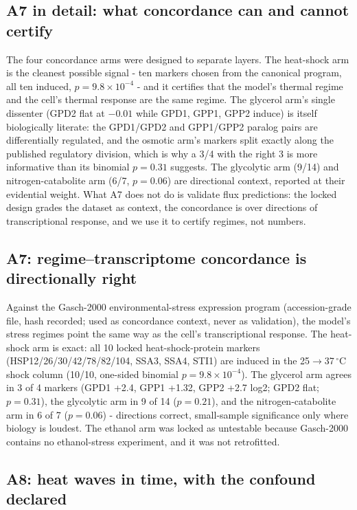 \documentclass[12pt]{article}
\begin{document}
\subsection{A7 in detail: what concordance can and cannot certify}

The four concordance arms were designed to separate layers. The
heat-shock arm is the cleanest possible signal - ten markers chosen
from the canonical program, all ten induced, $p=9.8\times10^{-4}$ -
and it certifies that the model's thermal regime and the cell's
thermal response are the same regime. The glycerol arm's single
dissenter (GPD2 flat at $-0.01$ while GPD1, GPP1, GPP2 induce) is
itself biologically literate: the GPD1/GPD2 and GPP1/GPP2 paralog
pairs are differentially regulated, and the osmotic arm's markers
split exactly along the published regulatory division, which is why a
3/4 with the right 3 is more informative than its binomial $p=0.31$
suggests. The glycolytic arm (9/14) and nitrogen-catabolite arm
(6/7, $p=0.06$) are directional context, reported at their evidential
weight. What A7 does not do is validate flux predictions: the locked
design grades the dataset as context, the concordance is over
directions of transcriptional response, and we use it to certify
regimes, not numbers.

\subsection{A7: regime--transcriptome concordance is directionally right}
\label{sec:a7}

Against the Gasch-2000 environmental-stress expression program
(accession-grade file, hash recorded; used as concordance context,
never as validation), the model's stress regimes point the same way as
the cell's transcriptional response. The heat-shock arm is exact: all
10 locked heat-shock-protein markers (HSP12/26/30/42/78/82/104, SSA3,
SSA4, STI1) are induced in the 25$\to$37\,$^{\circ}$C shock column
(10/10, one-sided binomial $p=9.8\times10^{-4}$). The glycerol arm
agrees in 3 of 4 markers (GPD1 +2.4, GPP1 +1.32, GPP2 +2.7 log2;
GPD2 flat; $p=0.31$), the glycolytic arm in 9 of 14 ($p=0.21$), and
the nitrogen-catabolite arm in 6 of 7 ($p=0.06$) - directions correct,
small-sample significance only where biology is loudest. The ethanol
arm was locked as untestable because Gasch-2000 contains no
ethanol-stress experiment, and it was not retrofitted.

\subsection{A8: heat waves in time, with the confound declared}
\label{sec:a8}
\end{document}
